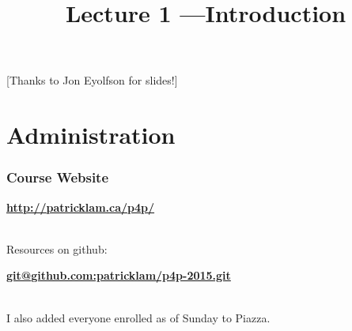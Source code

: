 

\title{Lecture 1 ---Introduction}



\begin{frame}[plain]
  \titlepage

\begin{center}
  [Thanks to Jon Eyolfson for slides!]
\end{center}
\end{frame}

\section{Administration}
\begin{frame}
  \frametitle{Course Website}

  \begin{changemargin}{2cm}
  \begin{center}
    \bf \url{http://patricklam.ca/p4p/}
  \end{center}
~\\

  Resources on github:
  \begin{center}
    \bf \url{git@github.com:patricklam/p4p-2015.git}
  \end{center}
  
~\\
  I also added everyone enrolled as of Sunday to Piazza.
  \end{changemargin}
\end{frame}

